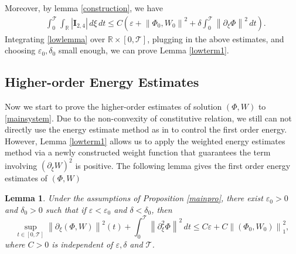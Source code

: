 \documentclass[12pt,reqno]{amsart}
\numberwithin{equation}{section}
\newcommand{\norm}[1]{\left\lVert #1 \right\rVert}
\def\p{\partial}
\def\R{\mathbb{R}}
\def\T{\mathcal{T}}
\def\supt{\mathop{sup}\limits_{t \in [0,\mathcal{T}]}}
\newtheorem{lemma}[theorem]{Lemma}
\begin{document}
Moreover, by lemma \ref{construction}, we have
\begin{equation}\label{I2.3}
	\begin{aligned}
		&\int_{0}^{\T} \int_{\R}|\mathbf{I}_{2,4}| \,d\xi  \,dt \leq C(\varepsilon+\norm{\Phi_0,W_0}^2+\delta\int_{0}^{\T} \norm{\p_{\xi}\Phi}^2 \,dt ).
	\end{aligned}
\end{equation}
 Integrating \eqref{lowlemma} over $\R\times[0,\T]$, plugging in the above estimates, and choosing $\varepsilon_0,\delta_0$ small enough, we can 
prove Lemma \ref{lowterm1}.
\subsection{Higher-order Energy Estimates}\label{3.2sec}
Now we start to prove the higher-order estimates of solution $(\Phi,W)$ to \eqref{mainsystem}. Due to the non-convexity of constitutive relation,  we still can not directly
use the energy estimate method as in \cite{HuangYuanCMP} to control the first order energy.  However, Lemma \ref{lowterm1} allows us to apply the weighted energy estimates method via a newly constructed weight function that guarantees the term involving $(\partial_{\xi}W)^2$ is positive. The following lemma gives the first order energy estimates of $(\Phi, W)$
\begin{lemma}\label{lowterm2}
	Under the assumptions of Proposition \ref{mainpro}, there exist $\varepsilon_0>0$ and $\delta_0>0$ such that if $\varepsilon<\varepsilon_0$ and $\delta<\delta_0$, then
	\begin{equation}\label{estimate2}
		\supt\norm{\p_{\xi}(\Phi,W)}^2(t)+\int_{0}^{\T}\norm{\p^2_{\xi}\Phi}^2 \,dt\leq C\varepsilon+C\norm{(\Phi_0,W_0)}^2_1,
	\end{equation}
	where $C>0$ is independent of $\varepsilon,\delta$ and $\T$.
\end{lemma}
\end{document}
